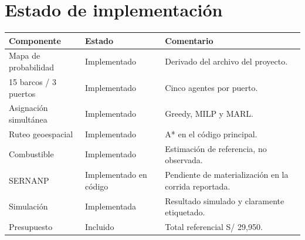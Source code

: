 \section{Estado de implementación}
\begin{longtable}{p{4.2cm}p{3.2cm}p{7cm}}
\toprule
Componente & Estado & Comentario \\
\midrule
Mapa de probabilidad & Implementado & Derivado del archivo del proyecto. \\
15 barcos / 3 puertos & Implementado & Cinco agentes por puerto. \\
Asignación simultánea & Implementado & Greedy, MILP y MARL. \\
Ruteo geoespacial & Implementado & A* en el código principal. \\
Combustible & Implementado & Estimación de referencia, no observada. \\
SERNANP & Implementado en código & Pendiente de materialización en la corrida reportada. \\
Simulación & Implementada & Resultado simulado y claramente etiquetado. \\
Presupuesto & Incluido & Total referencial S/ 29,950. \\
\bottomrule
\end{longtable}